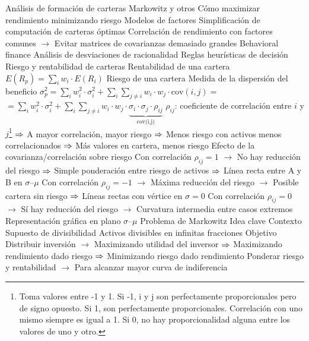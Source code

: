 \documentclass{nuevotema}
\begin{document}
\begin{esquemal}
				\4 Análisis de formación de carteras
				\4[] Markowitz y otros
				\4[] Cómo maximizar rendimiento minimizando riesgo
				\4 Modelos de factores
				\4[] Simplificación de computación de carteras óptimas
				\4[] Correlación de rendimiento con factores comunes
				\4[] $\to$ Evitar matrices de covarianzas demasiado grandes
				\4 Behavioral finance
				\4[] Análisis de desviaciones de racionalidad
				\4[] Reglas heurísticas de decisión
		\2 Riesgo y rentabilidad de carteras
			\3 Rentabilidad de una cartera
				\4 $E(R_p) = \sum_i w_i \cdot E(R_i)$
			\3 Riesgo de una cartera
				\4 Medida de la dispersión del beneficio
				\4 $\sigma_p^2 = \sum_i w_i^2 \cdot \sigma_i^2 + \sum_i \sum_{j\neq i} w_i \cdot w_j \cdot \textrm{cov}(i,j) =$
				\4[] \quad \, \, $=\sum_i w_i^2 \cdot \sigma_i^2 + \sum_i \sum_{j\neq i} w_i \cdot w_j \cdot \underbrace{\sigma_i \cdot \sigma_j \cdot \rho_{ij}}_{\text{cov(i,j)}}$
				\4[] $\rho_{ij}$: coeficiente de correlación entre $i$ y $j$\footnote{Toma valores entre -1 y 1. Si -1, i y j son perfectamente proporcionales pero de signo opuesto. Si 1, son perfectamente proporcionales. Correlación con uno mismo siempre es igual a 1. Si 0, no hay proporcionalidad alguna entre los valores de uno y otro.}
				\4[] $\Rightarrow$ A mayor correlación, mayor riesgo
				\4[] $\Rightarrow$ Menos riesgo con activos menos correlacionados
				\4[] $\Rightarrow$ Más valores en cartera, menos riesgo
				\4 Efecto de la covarianza/correlación sobre riesgo
				\4[] Con correlación $\rho_{ij} =1$
				\4[] $\to$ No hay reducción del riesgo
				\4[] $\Rightarrow$ Simple ponderación entre riesgo de activos
				\4[] $\Rightarrow$ Línea recta entre A y B en $\sigma$--$\mu$
				\4[] Con correlación $\rho_{ij} = -1$
				\4[] $\to$ Máxima reducción del riesgo
				\4[] $\to$ Posible cartera sin riesgo
				\4[] $\Rightarrow$ Líneas rectas con vértice en $\sigma = 0$
				\4[] Con correlación $\rho_{ij} = 0$
				\4[] $\to$ Sí hay reducción del riesgo
				\4[] $\to$ Curvatura intermedia entre casos extremos
				\4[] Representación gráfica en plano $\sigma$--$\mu$
				\4[] 
		\2 Problema de Markowitz
			\3 Idea clave
				\4 Contexto
				\4[] Supuesto de divisibilidad
				\4[] Activos divisibles en infinitas fracciones
				\4 Objetivo
				\4[] Distribuir inversión
				\4[] $\to$ Maximizando utilidad del inversor
				\4[] $\Rightarrow$ Maximizando rendimiento dado riesgo
				\4[] $\Rightarrow$ Minimizando riesgo dado rendimiento
				\4[] Ponderar riesgo y rentabilidad
				\4[] $\to$ Para alcanzar mayor curva de indiferencia

\end{esquemal}
\end{document}

